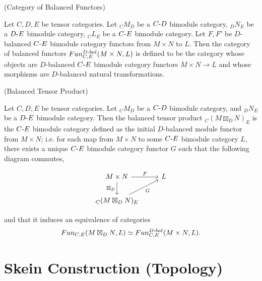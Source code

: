 \begin{definition} (Category of Balanced Functors)

  \noindent Let $C, D, E$ be tensor categories. Let $_{C}M_{D}$ be a
  $C{\text -}D$ bimodule category, $_{D}N_{E}$ be a $D{\text -}E$ bimodule
  category, $_{C}L_{E}$ be a $C{\text -}E$ bimodule category. Let $F, F'$ be
  $D$-balanced $C{\text -}E$ bimodule category functors from $M \times N$ to $L$.
  \quad Then the category of balanced functors
  $Fun^{D{\text -}bal}_{C,E}(M \times N, L)$ is defined to be the category whose
  objects are $D$-balanced $C{\text -}E$ bimodule category functors
  $M \times N \to L$ and whose morphisms are $D$-balanced natural transformations.
\end{definition}


\begin{definition} (Balanced Tensor Product)

  \noindent Let $C, D, E$ be tensor categories. Let $_{C}M_{D}$ be a
  $C{\text -}D$ bimodule category, and $_{D}N_{E}$ be a $D{\text -}E$ bimodule
  category. \quad Then the balanced tensor product $_{C}(M \boxtimes_{D} N)_{E}$ is
  the $C{\text -}E$ bimodule category defined as the initial $D$-balanced
  module functor from $M \times N$; i.e. for each map from $M \times N$ to some
  $C{\text -}E$ bimodule category $L$, there exists a unique $C{\text -}E$
  bimodule category functor $G$ such that the following diagram commutes,

  \[
    \begin{tikzcd}
      M \times N \arrow[r, "F"] \arrow[d, "\boxtimes_{D}"'] & L \\
      _{C}(M \boxtimes_{D} N)_{E} \arrow[ur, "G"']
    \end{tikzcd}
  \]

  \noindent and that it induces an equivalence of categories
  \[Fun_{C,E}(M \boxtimes_{D} N, L) \simeq Fun_{C,E}^{D{\text -}bal}(M \times N, L).\]
\end{definition}

\section{Skein Construction (Topology)}\label{section/skein-construction}

